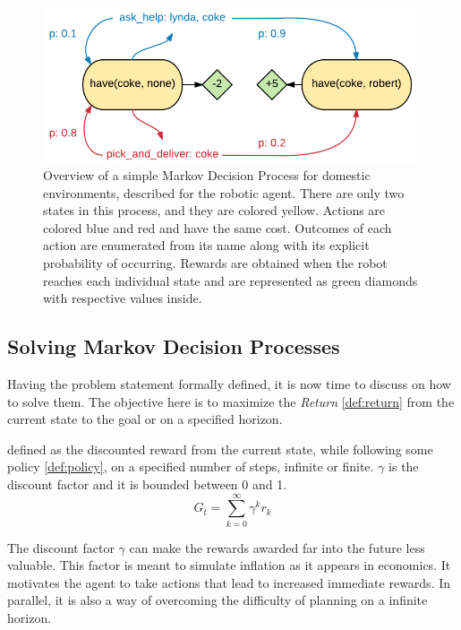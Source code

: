 \begin{figure}[H]
    \centering
        \includegraphics[width=11cm]{images/mdp_example}
        \caption{Overview of a simple Markov Decision Process for domestic environments,
        described for the robotic agent. There are only two states in this
        process, and they are colored yellow. Actions are colored blue and red and
        have the same cost. Outcomes of each action are enumerated from its name
        along with its explicit probability of occurring. Rewards are obtained
        when the robot reaches each individual state and are represented as
        green diamonds with respective values inside.}
        \label{fig:mdp_example}
\end{figure}

\subsection{Solving Markov Decision Processes}

Having the problem statement formally defined, it is now time to discuss on how
to solve them. The objective here is to maximize the
\textit{Return} \ref{def:return} from the current state to the goal or on a
specified horizon.

\begin{definition}[Return] defined as the discounted reward from the current
    state, while following some policy \ref{def:policy}, on a specified number
    of steps, infinite or finite. $\gamma$ is the discount factor and it is
    bounded between 0 and 1.
    \begin{equation}
        G_t = \sum_{k=0}^{\infty} \gamma^{k} r_{k}
        \label{eq: mdp_return}
    \end{equation}
    \label{def:return}
\end{definition}

The discount factor $\gamma$ can make the rewards awarded far into the future
less valuable. This factor is meant to simulate inflation as it appears in economics.
It motivates the agent to take actions that lead to increased immediate rewards.
In parallel, it is also a way of overcoming the difficulty of planning on a
infinite horizon.

